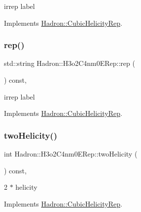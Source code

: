 irrep label 

Implements \mbox{\hyperlink{structHadron_1_1CubicHelicityRep_a8cdd86f068a167dc96faef02bfb8a33d}{Hadron\+::\+Cubic\+Helicity\+Rep}}.

\mbox{\label{structHadron_1_1H3o2C4nm0ERep_aba80c4eba2c70fb467683c3ea8d67aa8}} 
\subsubsection{\texorpdfstring{rep()}{rep()}\hspace{0.1cm}{\footnotesize\ttfamily [3/3]}}
{\footnotesize\ttfamily std\+::string Hadron\+::\+H3o2\+C4nm0\+E\+Rep\+::rep (\begin{DoxyParamCaption}{ }\end{DoxyParamCaption}) const\hspace{0.3cm}{\ttfamily [inline]}, {\ttfamily [virtual]}}

irrep label 

Implements \mbox{\hyperlink{structHadron_1_1CubicHelicityRep_a8cdd86f068a167dc96faef02bfb8a33d}{Hadron\+::\+Cubic\+Helicity\+Rep}}.

\mbox{\label{structHadron_1_1H3o2C4nm0ERep_a02b0a0895d49ca7a0dd5aa6cdacc877e}} 
\subsubsection{\texorpdfstring{twoHelicity()}{twoHelicity()}\hspace{0.1cm}{\footnotesize\ttfamily [1/3]}}
{\footnotesize\ttfamily int Hadron\+::\+H3o2\+C4nm0\+E\+Rep\+::two\+Helicity (\begin{DoxyParamCaption}{ }\end{DoxyParamCaption}) const\hspace{0.3cm}{\ttfamily [inline]}, {\ttfamily [virtual]}}

2 $\ast$ helicity 

Implements \mbox{\hyperlink{structHadron_1_1CubicHelicityRep_af507aa56fc2747eacc8cb6c96db31ecc}{Hadron\+::\+Cubic\+Helicity\+Rep}}.

\mbox{\label{structHadron_1_1H3o2C4nm0ERep_a02b0a0895d49ca7a0dd5aa6cdacc877e}} 

